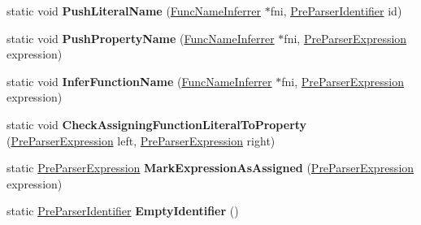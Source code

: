 \begin{DoxyCompactItemize}
\item 
static void {\bfseries Push\+Literal\+Name} (\hyperlink{classv8_1_1internal_1_1_func_name_inferrer}{Func\+Name\+Inferrer} $\ast$fni, \hyperlink{classv8_1_1internal_1_1_pre_parser_identifier}{Pre\+Parser\+Identifier} id)\hypertarget{classv8_1_1internal_1_1_pre_parser_traits_a1def14ba4bdc98f938bd33117767a262}{}\label{classv8_1_1internal_1_1_pre_parser_traits_a1def14ba4bdc98f938bd33117767a262}

\item 
static void {\bfseries Push\+Property\+Name} (\hyperlink{classv8_1_1internal_1_1_func_name_inferrer}{Func\+Name\+Inferrer} $\ast$fni, \hyperlink{classv8_1_1internal_1_1_pre_parser_expression}{Pre\+Parser\+Expression} expression)\hypertarget{classv8_1_1internal_1_1_pre_parser_traits_a9b17c0e9fc8b319e769666796aac2150}{}\label{classv8_1_1internal_1_1_pre_parser_traits_a9b17c0e9fc8b319e769666796aac2150}

\item 
static void {\bfseries Infer\+Function\+Name} (\hyperlink{classv8_1_1internal_1_1_func_name_inferrer}{Func\+Name\+Inferrer} $\ast$fni, \hyperlink{classv8_1_1internal_1_1_pre_parser_expression}{Pre\+Parser\+Expression} expression)\hypertarget{classv8_1_1internal_1_1_pre_parser_traits_a39f0c9b323138750c812a6ffd9654015}{}\label{classv8_1_1internal_1_1_pre_parser_traits_a39f0c9b323138750c812a6ffd9654015}

\item 
static void {\bfseries Check\+Assigning\+Function\+Literal\+To\+Property} (\hyperlink{classv8_1_1internal_1_1_pre_parser_expression}{Pre\+Parser\+Expression} left, \hyperlink{classv8_1_1internal_1_1_pre_parser_expression}{Pre\+Parser\+Expression} right)\hypertarget{classv8_1_1internal_1_1_pre_parser_traits_ac2b07bf4032c386ed8810a6ffb3d7800}{}\label{classv8_1_1internal_1_1_pre_parser_traits_ac2b07bf4032c386ed8810a6ffb3d7800}

\item 
static \hyperlink{classv8_1_1internal_1_1_pre_parser_expression}{Pre\+Parser\+Expression} {\bfseries Mark\+Expression\+As\+Assigned} (\hyperlink{classv8_1_1internal_1_1_pre_parser_expression}{Pre\+Parser\+Expression} expression)\hypertarget{classv8_1_1internal_1_1_pre_parser_traits_a0ca471f95500b1ad12d6b4ffa205b7f3}{}\label{classv8_1_1internal_1_1_pre_parser_traits_a0ca471f95500b1ad12d6b4ffa205b7f3}

\item 
static \hyperlink{classv8_1_1internal_1_1_pre_parser_identifier}{Pre\+Parser\+Identifier} {\bfseries Empty\+Identifier} ()\hypertarget{classv8_1_1internal_1_1_pre_parser_traits_a5129a407bdff898355049d82ab869596}{}\label{classv8_1_1internal_1_1_pre_parser_traits_a5129a407bdff898355049d82ab869596}


\end{DoxyCompactItemize}
